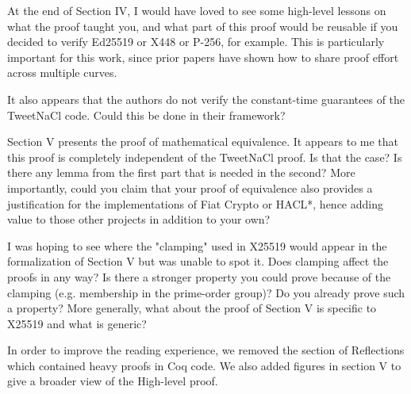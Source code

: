 At the end of Section IV, I would have loved to see some high-level lessons on
what the proof taught you, and what part of this proof would be reusable if you
decided to verify Ed25519 or X448 or P-256, for example. This is particularly
important for this work, since prior papers have shown how to share proof effort
across multiple curves.

It also appears that the authors do not verify the constant-time guarantees of
the TweetNaCl code. Could this be done in their framework?

Section V presents the proof of mathematical equivalence. It appears to me that
this proof is completely independent of the TweetNaCl proof. Is that the case?
Is there any lemma from the first part that is needed in the second? More
importantly, could you claim that your proof of equivalence also provides a
justification for the implementations of Fiat Crypto or HACL*, hence adding
value to those other projects in addition to your own?

I was hoping to see where the "clamping" used in X25519 would appear in the
formalization of Section V but was unable to spot it. Does clamping affect the
proofs in any way? Is there a stronger property you could prove because of the
clamping (e.g. membership in the prime-order group)?
Do you already prove such a property?  More generally, what about the proof of
Section V is specific to X25519 and what is generic?


In order to improve the reading experience, we removed the section of Reflections
which contained heavy proofs in Coq code. We also added figures in section V to
give a broader view of the High-level proof.

